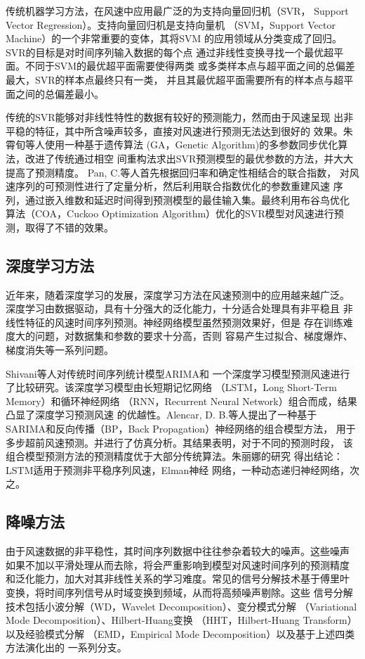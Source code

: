 \documentclass[AutoFakeBold]{LZUThesis}
\begin{document}
传统机器学习方法，在风速中应用最广泛的为支持向量回归机（SVR，
Support Vector Regression）。支持向量回归机是支持向量机
（SVM，Support Vector Machine）的一个非常重要的变体，其将SVM
的应用领域从分类变成了回归。SVR的目标是对时间序列输入数据的每个点
通过非线性变换寻找一个最优超平面。不同于SVM的最优超平面需要使得两类
或多类样本点与超平面之间的总偏差最大，SVR的样本点最终只有一类，
并且其最优超平面需要所有的样本点与超平面之间的总偏差最小。

传统的SVR能够对非线性特性的数据有较好的预测能力，然而由于风速呈现
出非平稳的特征，其中所含噪声较多，直接对风速进行预测无法达到很好的
效果。朱霄旬等人\cite{朱霄旬2017遗传算法对}使用一种基于遗传算法
(GA，Genetic Algorithm)的多参数同步优化算法，改进了传统通过相空
间重构法求出SVR预测模型的最优参数的方法，并大大提高了预测精度。
Pan, C.等人\cite{2018Hybrid}首先根据回归率和确定性相结合的联合指数，
对风速序列的可预测性进行了定量分析，然后利用联合指数优化的参数重建风速
序列，通过嵌入维数和延迟时间得到预测模型的最佳输入集。最终利用布谷鸟优化
算法（COA，Cuckoo Optimization Algorithm）优化的SVR模型对风速进行预
测，取得了不错的效果。

\subsection{深度学习方法}

近年来，随着深度学习的发展，深度学习方法在风速预测中的应用越来越广泛。
深度学习由数据驱动，具有十分强大的泛化能力，十分适合处理具有非平稳且
非线性特征的风速时间序列预测。神经网络模型虽然预测效果好，但是
存在训练难度大的问题，对数据集和参数的要求十分高，否则
容易产生过拟合、梯度爆炸、梯度消失等一系列问题。

Shivani等人\cite{Shivani2019A}对传统时间序列统计模型ARIMA和
一个深度学习模型预测风速进行了比较研究。该深度学习模型由长短期记忆网络
（LSTM，Long Short-Term Memory）和循环神经网络
（RNN，Recurrent Neural Network）组合而成，结果凸显了深度学习预测风速
的优越性。Alencar, D. B.等人\cite{alencar2018hybrid}提出了一种基于
SARIMA和反向传播（BP，Back Propagation）神经网络的组合模型方法，
用于多步超前风速预测。并进行了仿真分析。其结果表明，对于不同的预测时段，
该组合模型预测方法的预测精度优于大部分传统算法。朱丽娜的研究
\cite{朱丽娜2021风电}得出结论：LSTM适用于预测非平稳序列风速，Elman神经
网络，一种动态递归神经网络，次之。

\subsection{降噪方法}
由于风速数据的非平稳性，其时间序列数据中往往参杂着较大的噪声。这些噪声
如果不加以平滑处理从而去除，将会严重影响到模型对风速时间序列的预测精度
和泛化能力，加大对其非线性关系的学习难度。常见的信号分解技术基于傅里叶
变换，将时间序列信号从时域变换到频域，从而将高频噪声剔除。这些
信号分解技术包括小波分解（WD，Wavelet Decomposition）、变分模式分解
（Variational Mode Decomposition）、Hilbert-Huang变换
（HHT，Hilbert-Huang Transform）以及经验模式分解
（EMD，Empirical Mode Decomposition）以及基于上述四类方法演化出的
一系列分支。
\end{document}
